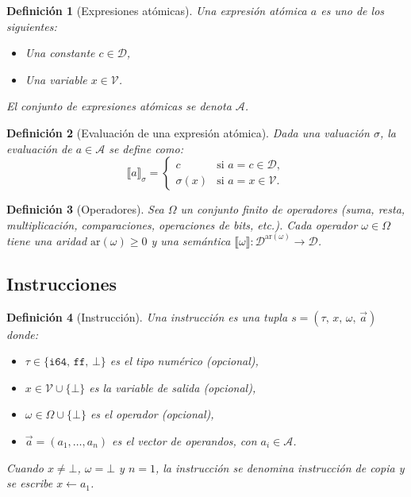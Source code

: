 \documentclass[12pt, a4paper]{article}
\newtheorem{definition}{Definición}[section]
\begin{document}
\begin{definition}[Expresiones atómicas]
Una \emph{expresión atómica} $a$ es uno de los siguientes:
\begin{itemize}
  \item Una constante $c \in \mathcal{D}$,
  \item Una variable $x \in \mathcal{V}$.
\end{itemize}
El conjunto de expresiones atómicas se denota $\mathcal{A}$.
\end{definition}

\begin{definition}[Evaluación de una expresión atómica]
Dada una valuación $\sigma$, la evaluación de $a \in \mathcal{A}$ se define como:
\[
  \llbracket a \rrbracket_\sigma =
  \begin{cases}
    c         & \text{si } a = c \in \mathcal{D},\\
    \sigma(x) & \text{si } a = x \in \mathcal{V}.
  \end{cases}
\]
\end{definition}

\begin{definition}[Operadores]
Sea $\Omega$ un conjunto finito de \emph{operadores} (suma, resta, multiplicación, comparaciones,
operaciones de bits, etc.). Cada operador $\omega \in \Omega$ tiene una \emph{aridad}
$\mathrm{ar}(\omega) \geq 0$ y una \emph{semántica}
$\llbracket \omega \rrbracket : \mathcal{D}^{\mathrm{ar}(\omega)} \to \mathcal{D}$.
\end{definition}

\subsection{Instrucciones}

\begin{definition}[Instrucción]
\label{def:instruccion}
Una \emph{instrucción} es una tupla $s = (\tau,\, x,\, \omega,\, \vec{a})$ donde:
\begin{itemize}
  \item $\tau \in \{\texttt{i64},\, \texttt{ff},\, \bot\}$ es el tipo numérico (opcional),
  \item $x \in \mathcal{V} \cup \{\bot\}$ es la variable de salida (opcional),
  \item $\omega \in \Omega \cup \{\bot\}$ es el operador (opcional),
  \item $\vec{a} = (a_1, \ldots, a_n)$ es el vector de operandos, con $a_i \in \mathcal{A}$.
\end{itemize}
Cuando $x \neq \bot$, $\omega = \bot$ y $n = 1$, la instrucción se denomina
\emph{instrucción de copia} y se escribe $x \leftarrow a_1$.
\end{definition}
\end{document}
